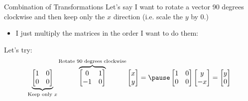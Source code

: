 \documentclass[aspectratio=169,t,11pt,table]{beamer}
\begin{document}
\begin{frame}{Combination of Transformations}
  Let's say I want to rotate a vector 90 degrees clockwise and then keep only the $x$ direction (i.e. scale the $y$ by $0$.)
  \begin{itemize}
    \item I just multiply the matrices in the order I want to do them:
  \end{itemize}

  Let's try:
  $$
    \underbrace{\begin{bmatrix} 1 & 0 \\ 0 & 0 \end{bmatrix}}_{\text{Keep only } x} 
    \overbrace{\begin{bmatrix} 0 & 1 \\ -1 & 0 \end{bmatrix}}^{\text{Rotate 90 degrees clockwise}} 
    \begin{bmatrix} x \\ y \end{bmatrix} = 
    \pause
    \begin{bmatrix} 1 & 0 \\ 0 & 0 \end{bmatrix} \begin{bmatrix} y \\ -x \end{bmatrix} = \begin{bmatrix} y \\ 0 \end{bmatrix}
  $$
\end{frame}
\end{document}
